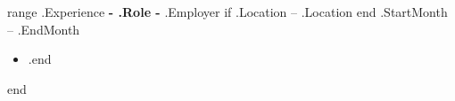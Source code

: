 \documentclass[10pt,letterpaper]{article}
\begin{document}
{{range .Experience}}
\textbf{ {{- .Role -}} } {{.Employer}}{{ if .Location }} -- {{.Location}} {{end}} \hfill {{.StartMonth}} -- {{.EndMonth}} \\
\vspace{-9pt}
\begin{itemize}{{range .Responsibilities}}
  \item {{.}}{{end}}
\end{itemize}

{{end}}
\vspace{-18.5pt}




\end{document}
